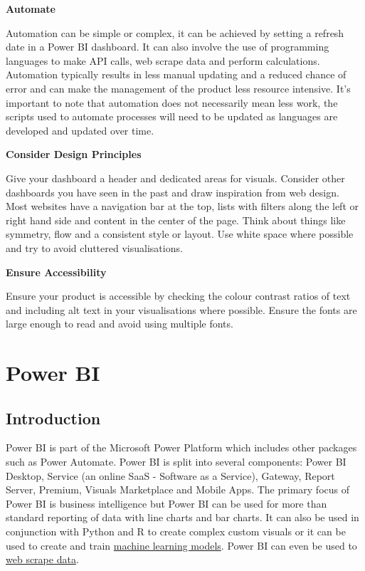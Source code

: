 \documentclass[
]{book}
\begin{document}
\textbf{Automate }

Automation can be simple or complex, it can be achieved by setting a refresh date in a Power BI dashboard. It can also involve the use of programming languages to make API calls, web scrape data and perform calculations. Automation typically results in less manual updating and a reduced chance of error and can make the management of the product less resource intensive. It's important to note that automation does not necessarily mean less work, the scripts used to automate processes will need to be updated as languages are developed and updated over time.

\textbf{Consider Design Principles}

Give your dashboard a header and dedicated areas for visuals. Consider other dashboards you have seen in the past and draw inspiration from web design. Most websites have a navigation bar at the top, lists with filters along the left or right hand side and content in the center of the page. Think about things like symmetry, flow and a consistent style or layout. Use white space where possible and try to avoid cluttered visualisations.

\textbf{Ensure Accessibility}

Ensure your product is accessible by checking the colour contrast ratios of text and including alt text in your visualisations where possible. Ensure the fonts are large enough to read and avoid using multiple fonts.

\hypertarget{power-bi}{%
\chapter{Power BI}\label{power-bi}}

\hypertarget{introduction}{%
\section{Introduction}\label{introduction}}

Power BI is part of the Microsoft Power Platform which includes other packages such as Power Automate. Power BI is split into several components: Power BI Desktop, Service (an online SaaS - Software as a Service), Gateway, Report Server, Premium, Visuals Marketplace and Mobile Apps. The primary focus of Power BI is business intelligence but Power BI can be used for more than standard reporting of data with line charts and bar charts. It can also be used in conjunction with Python and R to create complex custom visuals or it can be used to create and train \href{https://docs.microsoft.com/en-us/power-bi/connect-data/service-tutorial-build-machine-learning-model}{machine learning models}. Power BI can even be used to \href{https://docs.microsoft.com/en-us/power-bi/connect-data/desktop-connect-to-web-by-example}{web scrape data}.
\end{document}
